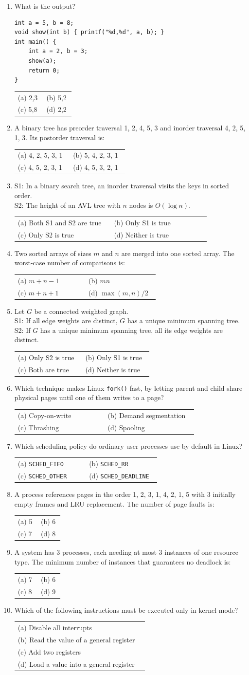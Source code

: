 \documentclass[11pt,a4paper]{article}
\makeatletter
\newcommand{\opts}[4]{\par\nopagebreak\vspace{2pt}%
\begin{tabular}{@{}p{0.47\linewidth}p{0.47\linewidth}@{}}
(a) #1 & (b) #2\\ (c) #3 & (d) #4\end{tabular}}
\newcommand{\optl}[4]{\par\nopagebreak\vspace{2pt}%
\begin{tabular}{@{}p{0.95\linewidth}@{}}
(a) #1\\ (b) #2\\ (c) #3\\ (d) #4\end{tabular}}
\makeatother
\begin{document}
\begin{enumerate}[resume]
\opts{\texttt{swap(p, q)}}{\texttt{swap(*p, *q)}}{\texttt{swap(\&p, \&q)}}{\texttt{swap(p, \&q)}}
\item What is the output?
\begin{verbatim}
int a = 5, b = 8;
void show(int b) { printf("%d,%d", a, b); }
int main() {
    int a = 2, b = 3;
    show(a);
    return 0;
}
\end{verbatim}
\opts{2,3}{5,2}{5,8}{2,2}
\item A binary tree has preorder traversal 1, 2, 4, 5, 3 and inorder traversal 4, 2, 5, 1, 3. Its postorder traversal is:
\opts{4, 2, 5, 3, 1}{5, 4, 2, 3, 1}{4, 5, 2, 3, 1}{4, 5, 3, 2, 1}
\item S1: In a binary search tree, an inorder traversal visits the keys in sorted order.\\ S2: The height of an AVL tree with $n$ nodes is $O(\log n)$.
\opts{Both S1 and S2 are true}{Only S1 is true}{Only S2 is true}{Neither is true}
\item Two sorted arrays of sizes $m$ and $n$ are merged into one sorted array. The worst-case number of comparisons is:
\opts{$m+n-1$}{$mn$}{$m+n+1$}{$\max(m,n)/2$}
\item Let $G$ be a connected weighted graph.\\ S1: If all edge weights are distinct, $G$ has a unique minimum spanning tree.\\ S2: If $G$ has a unique minimum spanning tree, all its edge weights are distinct.
\opts{Only S2 is true}{Only S1 is true}{Both are true}{Neither is true}
\item Which technique makes Linux \texttt{fork()} fast, by letting parent and child share physical pages until one of them writes to a page?
\opts{Copy-on-write}{Demand segmentation}{Thrashing}{Spooling}
\item Which scheduling policy do ordinary user processes use by default in Linux?
\opts{\texttt{SCHED\_FIFO}}{\texttt{SCHED\_RR}}{\texttt{SCHED\_OTHER}}{\texttt{SCHED\_DEADLINE}}
\item A process references pages in the order 1, 2, 3, 1, 4, 2, 1, 5 with 3 initially empty frames and LRU replacement. The number of page faults is:
\opts{5}{6}{7}{8}
\item A system has 3 processes, each needing at most 3 instances of one resource type. The minimum number of instances that guarantees no deadlock is:
\opts{7}{6}{8}{9}
\item Which of the following instructions must be executed only in kernel mode?
\optl{Disable all interrupts}{Read the value of a general register}{Add two registers}{Load a value into a general register}

\end{enumerate}
\end{document}
